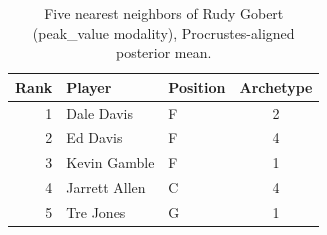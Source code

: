 \begin{table}[htbp]
  \centering\small
  \begin{tabular}{rllc}
    \toprule
    Rank & Player & Position & Archetype \\
    \midrule
    1 & Dale Davis & F & 2 \\
    2 & Ed Davis & F & 4 \\
    3 & Kevin Gamble & F & 1 \\
    4 & Jarrett Allen & C & 4 \\
    5 & Tre Jones & G & 1 \\
    \bottomrule
  \end{tabular}
  \caption{Five nearest neighbors of Rudy Gobert (peak_value modality), Procrustes-aligned posterior mean.}
  \label{tab:Rudy_Gobert_neighbors_peak_value}
\end{table}

